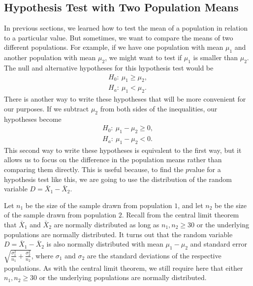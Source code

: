 \documentclass[letterpaper,10pt,english]{jupyterBook}
\begin{document}
\subsection{Hypothesis Test with Two Population Means}
\label{\detokenize{Ch9 Hypothesis Tests of Two or More Populations/9.1 Hypothesis Testing Two Population Means:hypothesis-test-with-two-population-means}}
\sphinxAtStartPar
In previous sections, we learned how to test the mean of a population in relation to a particular value. But sometimes, we want to compare the means of two different populations. For example, if we have one population with mean \(\mu_1\) and another population with mean \(\mu_2\), we might want to test if \(\mu_1\) is smaller than \(\mu_2\). The null and alternative hypotheses for this hypothesis test would be
\begin{align*}
H_0:\ \mu_1 \geq \mu_2, \\
H_a:\ \mu_1 < \mu_2.
\end{align*}
\sphinxAtStartPar
There is another way to write these hypotheses that will be more convenient for our purposes. If we subtract \(\mu_2\) from both sides of the inequalities, our hypotheses become
\begin{align*}
H_0:\ \mu_1 - \mu_2 \geq 0, \\
H_a:\ \mu_1 - \mu_2 < 0.
\end{align*}
\sphinxAtStartPar
This second way to write these hypotheses is equivalent to the first way, but it allows us to focus on the difference in the population means rather than comparing them directly. This is useful because, to find the \(p\)\sphinxhyphen{}value for a hypothesis test like this, we are going to use the distribution of the random variable \(D = \bar{X}_1 - \bar{X}_2\).

\sphinxAtStartPar
Let \(n_1\) be the size of the sample drawn from population \(1\), and let \(n_2\) be the size of the sample drawn from population \(2\). Recall from the central limit theorem that \(\bar{X}_1\) and \(\bar{X}_2\) are normally distributed as long as \(n_1, n_2 \geq 30\) or the underlying populations are normally distributed. It turns out that the random variable \(D = \bar{X}_1 - \bar{X}_2\) is also normally distributed with mean \(\mu_1 - \mu_2\) and standard error \(\sqrt{\frac{\sigma_1^2}{n_1} + \frac{\sigma_2^2}{n_2}}\), where \(\sigma_1\) and \(\sigma_2\) are the standard deviations of the respective populations. As with the central limit theorem, we still require here that either \(n_1, n_2 \geq 30\) or the underlying populations are normally distributed.
\end{document}
